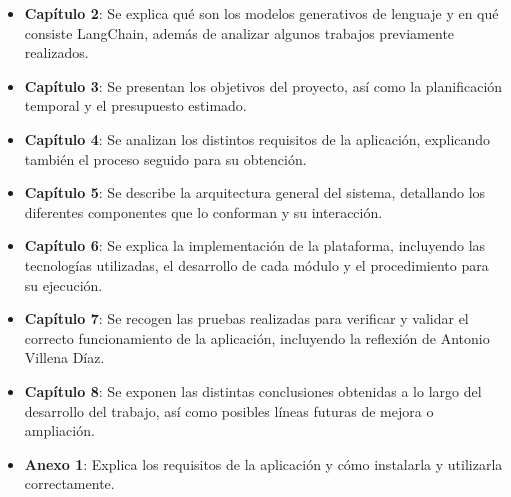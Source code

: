 \begin{itemize}
	\item \textbf{Capítulo 2}: Se explica qué son los modelos generativos de lenguaje y en qué consiste LangChain, además de analizar algunos trabajos previamente realizados.
	
	\item \textbf{Capítulo 3}: Se presentan los objetivos del proyecto, así como la planificación temporal y el presupuesto estimado.
	
	\item \textbf{Capítulo 4}: Se analizan los distintos requisitos de la aplicación, explicando también el proceso seguido para su obtención.
	
	\item \textbf{Capítulo 5}: Se describe la arquitectura general del sistema, detallando los diferentes componentes que lo conforman y su interacción.
	
	\item \textbf{Capítulo 6}: Se explica la implementación de la plataforma, incluyendo las tecnologías utilizadas, el desarrollo de cada módulo y el procedimiento para su ejecución.
	
	\item \textbf{Capítulo 7}: Se recogen las pruebas realizadas para verificar y validar el correcto funcionamiento de la aplicación, incluyendo la reflexión de Antonio Villena Díaz.
	
	\item \textbf{Capítulo 8}: Se exponen las distintas conclusiones obtenidas a lo largo del desarrollo del trabajo, así como posibles líneas futuras de mejora o ampliación.
	
	\item \textbf{Anexo 1}: Explica los requisitos de la aplicación y cómo instalarla y utilizarla correctamente.
\end{itemize}
